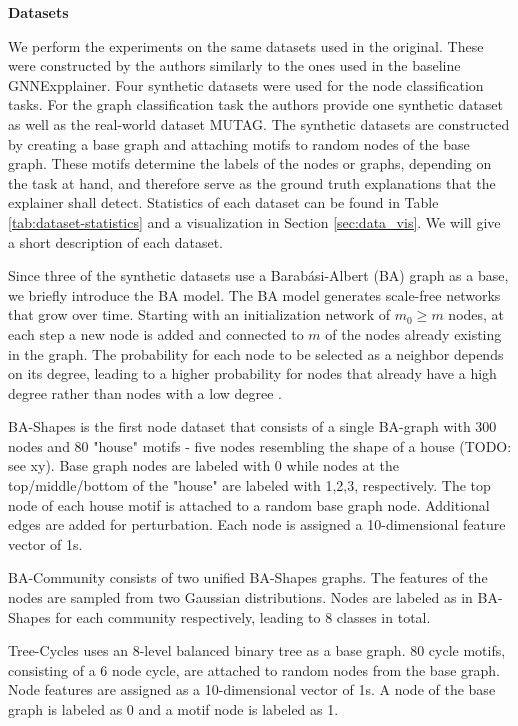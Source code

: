 \textbf{Datasets}\par
We perform the experiments on the same datasets used in the original. These were constructed by the authors similarly to the ones used in the baseline GNNExpplainer. Four synthetic datasets were used for the node classification tasks. For the graph classification task the authors provide one synthetic dataset as well as the real-world dataset MUTAG. The synthetic datasets are constructed by creating a base graph and attaching motifs to random nodes of the base graph. These motifs determine the labels of the nodes or graphs, depending on the task at hand, and therefore serve as the ground truth explanations that the explainer shall detect. Statistics of each dataset can be found in Table \ref{tab:dataset-statistics} and a visualization in Section \ref{sec:data_vis}. We will give a short description of each dataset. \bigskip

Since three of the synthetic datasets use a Barabási-Albert (BA) graph as a base, we briefly introduce the BA model. The BA model generates scale-free networks that grow over time. Starting with an initialization network of $m_0 \geq m$ nodes, at each step a new node is added and connected to $m$ of the nodes already existing in the graph. The probability for each node to be selected as a neighbor depends on its degree, leading to a higher probability for nodes that already have a high degree rather than nodes with a low degree \cite{albert2002statistical}. \bigskip

BA-Shapes is the first node dataset that consists of a single BA-graph with 300 nodes and 80 "house" motifs - five nodes resembling the shape of a house (TODO: see xy). Base graph nodes are labeled with 0 while nodes at the top/middle/bottom of the "house" are labeled with 1,2,3, respectively. The top node of each house motif is attached to a random base graph node. Additional edges are added for perturbation. Each node is assigned a 10-dimensional feature vector of 1s.

BA-Community consists of two unified BA-Shapes graphs. The features of the nodes are sampled from two Gaussian distributions. Nodes are labeled as in BA-Shapes for each community respectively, leading to 8 classes in total.

Tree-Cycles uses an 8-level balanced binary tree as a base graph. 80 cycle motifs, consisting of a 6 node cycle, are attached to random nodes from the base graph. Node features are assigned as a 10-dimensional vector of 1s. A node of the base graph is labeled as 0 and a motif node is labeled as 1.

